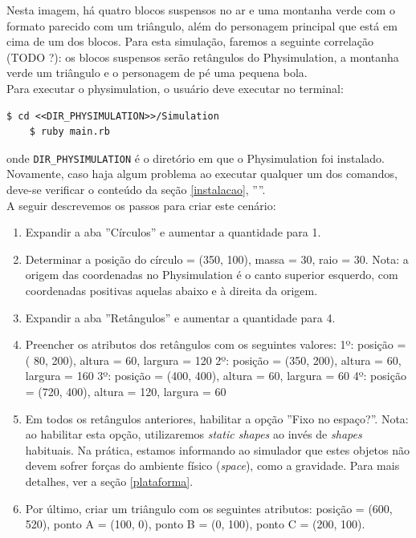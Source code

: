 Nesta imagem, há quatro blocos suspensos no ar e uma montanha verde com o formato parecido com um triângulo, além do personagem principal que está em cima de um dos blocos. Para esta simulação, faremos a seguinte correlação (TODO ?): os blocos suspensos serão retângulos do Physimulation, a montanha verde um triângulo e o personagem de pé uma pequena bola. \\

Para executar o physimulation, o usuário deve executar no terminal:

\begin{Verbatim}[fontsize=\footnotesize]
	$ cd <<DIR_PHYSIMULATION>>/Simulation
	$ ruby main.rb
\end{Verbatim}

onde {\tt\footnotesize DIR\_PHYSIMULATION} é o diretório em que o Physimulation foi instalado. Novamente, caso haja algum problema ao executar qualquer um dos comandos, deve-se verificar o conteúdo da seção \ref{instalacao}, ''''. \\

A seguir descrevemos os passos para criar este cenário:

\begin{enumerate}
	\item Expandir a aba ''Círculos'' e aumentar a quantidade para 1.
	\item Determinar a posição do círculo = (350, 100), massa = 30, raio = 30. \newline 
		  Nota: a origem das coordenadas no Physimulation é o canto superior esquerdo, com coordenadas positivas aquelas abaixo e à direita da origem.
	\item Expandir a aba ''Retângulos'' e aumentar a quantidade para 4.
	\item Preencher os atributos dos retângulos com os seguintes valores:
		\subitem 1º: posição = ( 80, 200), altura =  60, largura = 120 
		\subitem 2º: posição = (350, 200), altura =  60, largura = 160
		\subitem 3º: posição = (400, 400), altura =  60, largura =  60
		\subitem 4º: posição = (720, 400), altura = 120, largura =  60

	\item Em todos os retângulos anteriores, habilitar a opção ''Fixo no espaço?''. \newline 
		  Nota: ao habilitar esta opção, utilizaremos \textit{static shapes} ao invés de \textit{shapes} habituais. Na prática, estamos informando ao simulador que estes objetos não devem sofrer forças do ambiente físico (\textit{space}), como a gravidade. Para mais detalhes, ver a seção \ref{plataforma}. 

	\item Por último, criar um triângulo com os seguintes atributos: posição = (600, 520), ponto A = (100, 0), ponto B = (0, 100), ponto C = (200, 100). \newline 

\end{enumerate}

